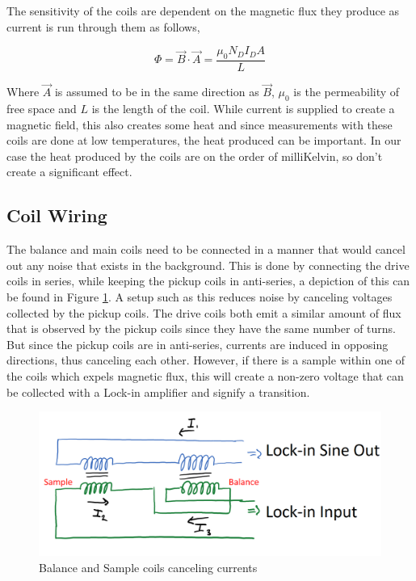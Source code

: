 \documentclass[11pt,onecolumn]{article}
\begin{document}
The sensitivity of the coils are dependent on the magnetic flux they produce as current is run through them as follows,

\begin{equation}
	\Phi = \vec{B}\cdot\vec{A} = \frac{\mu_0N_DI_DA}{L}
	\label{eq:2}
\end{equation}

Where $\vec{A}$ is assumed to be in the same direction as $\vec{B}$, $\mu_0$ is the permeability of free space and $L$ is the length of the coil. While current is supplied to create a magnetic field, this also creates some heat and since measurements with these coils are done at low temperatures, the heat produced can be important. In our case the heat produced by the coils are on the order of milliKelvin, so don't create a significant effect.

\subsection{Coil Wiring}
\label{sec:coils}

The balance and main coils need to be connected in a manner that would cancel out any noise that exists in the background. This is done by connecting the drive coils in series, while keeping the pickup coils in anti-series, a depiction of this can be found in Figure \ref{fig:7}. A setup such as this reduces noise by canceling voltages collected by the pickup coils. The drive coils both emit a similar amount of flux that is observed by the pickup coils since they have the same number of turns. But since the pickup coils are in anti-series, currents are induced in opposing directions, thus canceling each other. However, if there is a sample within one of the coils which expels magnetic flux, this will create a non-zero voltage that can be collected with a Lock-in amplifier and signify a transition.

\begin{figure}[ht]
	\centering
	\includegraphics[width=.6\columnwidth]{figures/canceling.png}
	\caption{Balance and Sample coils canceling currents}
	\label{fig:7}
\end{figure}
\end{document}

